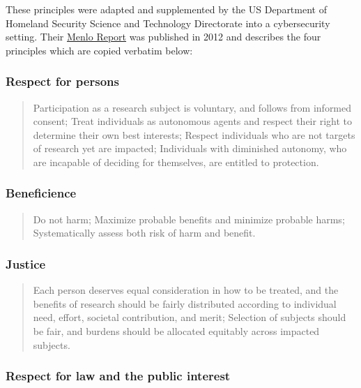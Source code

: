 \documentclass[]{book}
\theoremstyle{definition}
\theoremstyle{definition}
\theoremstyle{definition}
\theoremstyle{remark}
\begin{document}
These principles were adapted and supplemented by the US Department of
Homeland Security Science and Technology Directorate into a
cybersecurity setting. Their
\href{https://www.dhs.gov/sites/default/files/publications/CSD-MenloPrinciplesCORE-20120803_1.pdf}{Menlo
Report} was published in 2012 and describes the four principles which
are copied verbatim below:

\subsubsection{Respect for persons}\label{respect-for-persons}

\begin{quote}
Participation as a research subject is voluntary, and follows from
informed consent; Treat individuals as autonomous agents and respect
their right to determine their own best interests; Respect individuals
who are not targets of research yet are impacted; Individuals with
diminished autonomy, who are incapable of deciding for themselves, are
entitled to protection.
\end{quote}

\subsubsection{Beneficience}\label{beneficience}

\begin{quote}
Do not harm; Maximize probable benefits and minimize probable harms;
Systematically assess both risk of harm and benefit.
\end{quote}

\subsubsection{Justice}\label{justice}

\begin{quote}
Each person deserves equal consideration in how to be treated, and the
benefits of research should be fairly distributed according to
individual need, effort, societal contribution, and merit; Selection of
subjects should be fair, and burdens should be allocated equitably
across impacted subjects.
\end{quote}

\subsubsection{Respect for law and the public
interest}\label{respect-for-law-and-the-public-interest}
\end{document}
